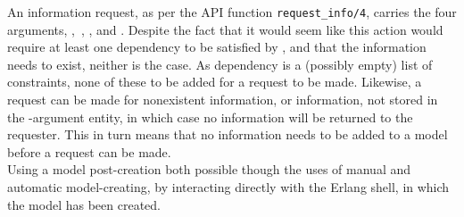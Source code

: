 An information request, as per the API function \lstinline{request_info/4}, carries the four arguments, , , , and . Despite the fact that it would seem like this action would require at least one dependency to be satisfied by , and that the information needs to exist, neither is the case. As dependency is a (possibly empty) list of constraints, none of these  to be added for a request to be made. Likewise, a request can be made for nonexistent information, or information, not stored in the -argument entity, in which case no information will be returned to the requester. This in turn means that no information needs to be added to a model before a request can be made.\\[0.1cm]
Using a model post-creation both possible though the uses of manual and automatic model-creating, by interacting directly with the Erlang shell, in which the model has been created. 
